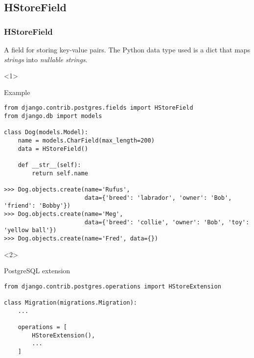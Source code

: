 \subsection{HStoreField}
\begin{frame}[fragile]
    \frametitle{HStoreField}

    A field for storing key-value pairs. The Python data type used is a dict that maps \emph{strings} into \emph{nullable strings}.

    \begin{onlyenv}<1>
        \begin{block}{Example}
            \begin{verbatim}
from django.contrib.postgres.fields import HStoreField
from django.db import models

class Dog(models.Model):
    name = models.CharField(max_length=200)
    data = HStoreField()

    def __str__(self):
        return self.name

>>> Dog.objects.create(name='Rufus',
                       data={'breed': 'labrador', 'owner': 'Bob', 'friend': 'Bobby'})
>>> Dog.objects.create(name='Meg',
                       data={'breed': 'collie', 'owner': 'Bob', 'toy': 'yellow ball'})
>>> Dog.objects.create(name='Fred', data={})
            \end{verbatim}
        \end{block}
    \end{onlyenv}

    \begin{onlyenv}<2>
        \begin{block}{PostgreSQL extension}
            \begin{verbatim}
from django.contrib.postgres.operations import HStoreExtension

class Migration(migrations.Migration):
    ...

    operations = [
        HStoreExtension(),
        ...
    ]
            \end{verbatim}
        \end{block}
    \end{onlyenv}

\end{frame}
